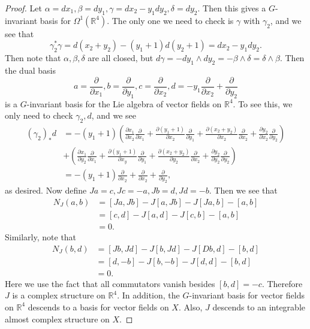 \documentclass[leqno, openany]{memoir}
\theoremstyle{definition}
\theoremstyle{remark}
\theoremstyle{plain}
\theoremstyle{definition}
\theoremstyle{remark}
\newcommand{\R}{\mathbb{R}}
\begin{document}
\begin{proof}
    Let $\alpha = dx_1, \beta = dy_1, \gamma = dx_2 - y_1 dy_2, \delta = dy_2$. Then this gives a $G$-invariant basis for $\Omega^1(\R^4)$. The only one we need to check is $\gamma$ with $\gamma_2$, and we see that
    \[ \gamma_2^* \gamma = d(x_2 + y_2) - (y_1 + 1)d (y_2 + 1) = dx_2 - y_1 dy_2. \]
    Then note that $\alpha, \beta, \delta$ are all closed, but $d \gamma = -dy_1 \wedge dy_2 = - \beta \wedge \delta = \delta \wedge \beta$.
    Then the dual basis
    \[ a = \frac{\partial}{\partial x_1}, b = \frac{\partial}{\partial y_1}, c = \frac{\partial}{\partial x_2}, d = -y_1 \frac{\partial}{\partial x_2} + \frac{\partial}{\partial y_2} \] 
    is a $G$-invariant basis for the Lie algebra of vector fields on $\R^4$. To see this, we only need to check $\gamma_2, d$, and we see
    \begin{align*}
        (\gamma_2)_* d &= -(y_1 + 1) \left( \frac{\partial x_1 }{\partial x_2} \frac{\partial}{\partial x_1} + \frac{\partial (y_1 + 1)}{\partial x_2} \frac{\partial}{\partial y_1} + \frac{\partial (x_2 + y_2)}{\partial x_2} \frac{\partial}{\partial x_2} + \frac{\partial y_2}{\partial x_2} \frac{\partial}{\partial y_2} \right) \\
                       &+ \left( \frac{\partial x_1 }{\partial y_2} \frac{\partial}{\partial x_1} + \frac{\partial (y_1 + 1)}{\partial x_y} \frac{\partial}{\partial y_1} + \frac{\partial (x_2 + y_2)}{\partial y_2} \frac{\partial}{\partial x_2} + \frac{\partial y_2}{\partial y_2} \frac{\partial}{\partial y_2} \right) \\
                       &= -(y_1 + 1) \frac{\partial}{\partial x_2} + \frac{\partial}{\partial x_2} + \frac{\partial}{\partial y_2},
    \end{align*}
    as desired. Now define $Ja = c, Jc = -a, Jb = d, Jd = -b$. Then we see that 
    \begin{align*}
        N_J(a,b) &= [Ja, Jb] - J[a,Jb] - J[Ja,b] - [a,b] \\
                 &= [c,d] - J[a,d] - J[c,b] - [a,b] \\
                 &= 0.
    \end{align*}
    Similarly, note that
    \begin{align*}
        N_J(b,d) &= [Jb, Jd] - J[b,Jd] - J[Db,d] - [b,d] \\
                 &= [d,-b] - J[b,-b] - J[d,d] - [b,d] \\
                 &= 0.
    \end{align*}
    Here we use the fact that all commutators vanish besides $[b,d] = -c$. Therefore $J$ is a complex structure on $\R^4$. In addition, the $G$-invariant basis for vector fields on $\R^4$ descends to a basis for vector fields on $X$. Also, $J$ descends to an integrable almost complex structure on $X$.
\end{proof}
\end{document}
